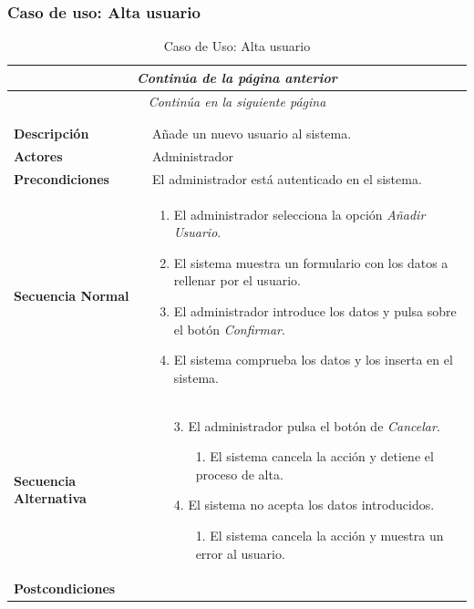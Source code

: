 \subsubsection*{Caso de uso: Alta usuario }
\begin{longtable}{| p{4cm} | p{10cm} |}
\endfirsthead
\multicolumn{2}{c}{\textit{Continúa de la página anterior}}\\[12pt]
\hline
\endhead
\hline
\multicolumn{2}{c}{\textit{Continúa en la siguiente página}} \\
\endfoot
\hline
\caption{Caso de Uso: Alta usuario}\label{fig:1}\\
\endlastfoot


\hline
\multicolumn{2}{|c|}{\textbf{CU$<$23$>$ - Alta Usuario}} \\

\hline
\textbf{Descripción} &
Añade un nuevo usuario al sistema.\\

\hline
\textbf{Actores} &
Administrador\\

\hline
\textbf{Precondiciones} &
El administrador está autenticado en el sistema.\\

\hline
\textbf{Secuencia Normal} &\mbox{}\par\vspace{-\baselineskip}
\begin{enumerate}[leftmargin=0.7cm, topsep=0.1cm]
\item El administrador selecciona la opción \textit{Añadir Usuario}.
\item El sistema muestra un formulario con los datos a rellenar por el usuario.
\item El administrador introduce los datos y pulsa sobre el botón \textit{Confirmar}.
\item El sistema comprueba los datos y los inserta en el sistema.
\end{enumerate}


\\
\hline
\textbf{Secuencia Alternativa} &\mbox{}\par\vspace{-\baselineskip}
\begin{enumerate}[leftmargin=0.9cm, topsep=0.1cm]
\item[3.] El administrador pulsa el botón de \textit{Cancelar}.
	\begin{itemize}
	\item[1.] El sistema cancela la acción y detiene el proceso de alta.
	\end{itemize}
\item[4.] El sistema no acepta los datos introducidos.
	\begin{itemize}
	\item[1.] El sistema cancela la acción y muestra un error al usuario.
	\end{itemize}
\end{enumerate}
\\

\hline
\textbf{Postcondiciones} & \\
\hline
\end{longtable}



